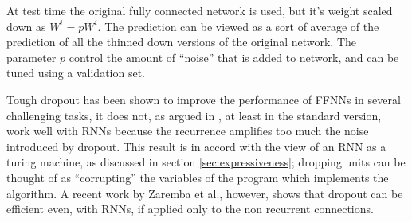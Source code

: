 At test time the original fully connected network is used, but it's weight scaled down as $W^{i} = pW^{i}$. The prediction can be viewed as a sort of average of the prediction of all the thinned down versions of the original network. The parameter $p$ control the amount of ``noise'' that is added to network, and can be tuned using a validation set.

Tough dropout has been shown \cite{dropout} to improve the performance of FFNNs in several challenging tasks, it does not, as argued in \cite{dropoutBayer}, at least in the standard version, work well with RNNs because the recurrence amplifies too much the noise introduced by dropout. This result is in accord with the view of an RNN as a turing machine, as discussed in section \ref{sec:expressiveness}; dropping units can be thought of as ``corrupting'' the variables of the program which implements the algorithm.
A recent work by Zaremba et al., however, shows that dropout can be efficient even, with RNNs, if applied only to the non recurrent connections\cite{dropoutRNNs}.
